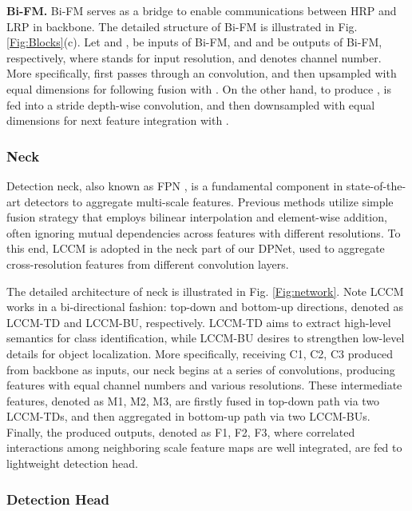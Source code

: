 \documentclass[lettersize,journal]{IEEEtran}
\begin{document}
\noindent \textbf{Bi-FM.} Bi-FM serves as a bridge to enable communications between HRP and LRP in backbone. The detailed structure of Bi-FM is illustrated in Fig. \ref{Fig:Blocks}(c). Let  and , be inputs of Bi-FM, and  and  be outputs of Bi-FM, respectively, where  stands for input resolution, and  denotes channel number. More specifically,  first passes through an  convolution, and then upsampled with equal dimensions for following fusion with . On the other hand, to produce ,  is fed into a  stride depth-wise convolution, and then downsampled with equal dimensions for next feature integration with .

\subsubsection{Neck}

Detection neck, also known as FPN \cite{lin2017feature}, is a fundamental component in state-of-the-art detectors to aggregate multi-scale features. Previous methods \cite{lin2017feature,liu2018path} utilize simple fusion strategy that employs bilinear interpolation and element-wise addition, often ignoring mutual dependencies across features with different resolutions. To this end, LCCM is adopted in the neck part of our DPNet, used to aggregate cross-resolution features from different convolution layers.

The detailed architecture of neck is illustrated in Fig. \ref{Fig:network}. Note LCCM works in a bi-directional fashion: top-down and bottom-up directions, denoted as LCCM-TD and LCCM-BU, respectively. LCCM-TD aims to extract high-level semantics for class identification, while LCCM-BU desires to strengthen low-level details for object localization. More specifically, receiving C1, C2, C3 produced from backbone as inputs, our neck begins at a series of  convolutions, producing features with equal channel numbers and various resolutions. These intermediate features, denoted as M1, M2, M3, are firstly fused in top-down path via two LCCM-TDs, and then aggregated in bottom-up path via two LCCM-BUs. Finally, the produced outputs, denoted as F1, F2, F3, where correlated interactions among neighboring scale feature maps are well integrated, are fed to lightweight detection head.





\subsubsection{Detection Head} 
\end{document}
